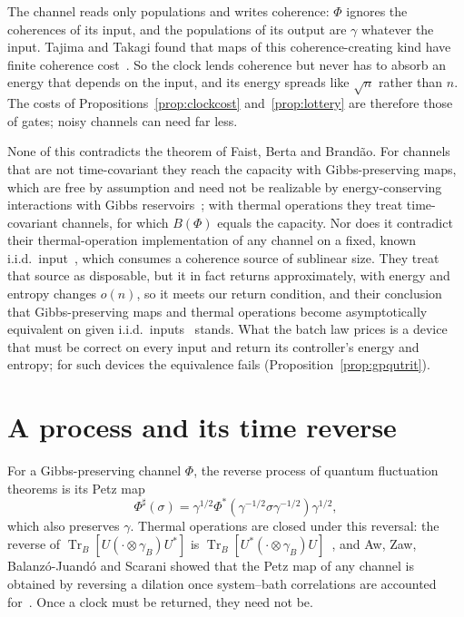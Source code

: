 \documentclass[11pt]{article}
\theoremstyle{definition}
\theoremstyle{remark}
\newcommand{\Tr}{\operatorname{Tr}}
\begin{document}
The channel reads only populations and writes coherence: $\Phi$ ignores the coherences of its input, and the populations of its output are $\gamma$ whatever the input. Tajima and Takagi found that maps of this coherence-creating kind have finite coherence cost~\cite{TajimaTakagi25}. So the clock lends coherence but never has to absorb an energy that depends on the input, and its energy spreads like $\sqrt n$ rather than $n$. The costs of Propositions~\ref{prop:clockcost} and~\ref{prop:lottery} are therefore those of gates; noisy channels can need far less.

None of this contradicts the theorem of Faist, Berta and Brand\~ao. For channels that are not time-covariant they reach the capacity with Gibbs-preserving maps, which are free by assumption and need not be realizable by energy-conserving interactions with Gibbs reservoirs~\cite{FBB19,FOR15,TajimaTakagi25}; with thermal operations they treat time-covariant channels, for which $B(\Phi)$ equals the capacity. Nor does it contradict their thermal-operation implementation of any channel on a fixed, known i.i.d.\ input~\cite[Prop.~8.3]{FBB21}, which consumes a coherence source of sublinear size. They treat that source as disposable, but it in fact returns approximately, with energy and entropy changes $o(n)$, so it meets our return condition, and their conclusion that Gibbs-preserving maps and thermal operations become asymptotically equivalent on given i.i.d.\ inputs~\cite{FBB19} stands. What the batch law prices is a device that must be correct on every input and return its controller's energy and entropy; for such devices the equivalence fails (Proposition~\ref{prop:gpqutrit}).

\section{A process and its time reverse}\label{sec:arrow}

For a Gibbs-preserving channel $\Phi$, the reverse process of quantum fluctuation theorems is its Petz map~\cite{Crooks08,KwonKim19}
\[
\Phi^\sharp(\sigma)=\gamma^{1/2}\Phi^*(\gamma^{-1/2}\sigma\gamma^{-1/2})\gamma^{1/2},
\]
which also preserves $\gamma$. Thermal operations are closed under this reversal: the reverse of $\Tr_B[U(\cdot\otimes\gamma_B)U^*]$ is $\Tr_B[U^*(\cdot\otimes\gamma_B)U]$~\cite{Crooks08,AWWW18}, and Aw, Zaw, Balanz\'o-Juand\'o and Scarani showed that the Petz map of any channel is obtained by reversing a dilation once system--bath correlations are accounted for~\cite{AwZawBalanzoScarani24}. Once a clock must be returned, they need not be.
\end{document}
